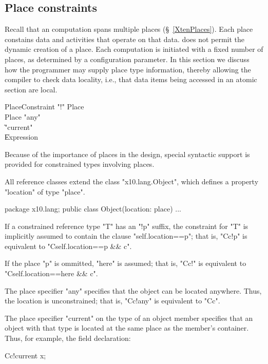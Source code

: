 \subsection{Place constraints}\label{PlaceTypes}
\label{DepType:PlaceType}

Recall that an \Xten{} computation spans multiple places
(\S~\ref{XtenPlaces}). Each place constains data and activities that
operate on that data.  \XtenCurrVer{} does not permit the dynamic
creation of a place. Each \Xten{} computation is initiated with a
fixed number of places, as determined by a configuration parameter.
In this section we discuss how the programmer may supply place type
information, thereby allowing the compiler to check data locality,
i.e., that data items being accessed in an atomic section are local.

\begin{grammar}
PlaceConstraint     \: \xcd"!" Place\opt \\
Place              \:  \xcd"any" \\
                        \| \xcd"current" \\
                        \| Expression \\
\end{grammar}

Because of the importance of places in the \Xten{} design, special
syntactic support is provided for constrained types involving places.

All \Xten{} reference classes extend the class
\xcd"x10.lang.Object", which defines a property
\xcd"location" of type
\xcd"place".

\begin{xten}
package x10.lang;
public class Object(location: place) { ... }  
\end{xten}

If a constrained reference type \xcd"T" has an \xcd"!p" suffix,
the constraint for \xcd"T" is implicitly assumed to contain the clause
\xcd"self.location==p"; that is,
\xcd"C{c}!p" is equivalent to \xcd"C{self.location==p && c}".

If the place \xcd"p" is ommitted, \xcd"here" is assumed; that is,
\xcd"C{c}!" is equivalent to \xcd"C{self.location==here && c}".

The place specifier \xcd"any" specifies that the object can be
located anywhere.  Thus, the location is unconstrained; that is,
\xcd"C{c}!any" is equivalent to \xcd"C{c}".

The place specifier \xcd"current" on the type of an object
member specifies that an object with that type is located at the
same place as the member's container.
Thus, for example, the field declaration:
\begin{xten}
    C{c}!current x;
\end{xten}

